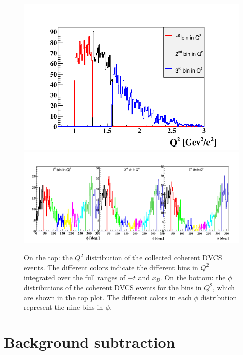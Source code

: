 \begin{figure}[h!]
\centering
\includegraphics[scale=0.36]{fig_results/Q2_Coh_bins.png}
\includegraphics[scale=0.45]{fig_results/bins_Coh_Q2_Phi.png}
\caption{On the top: the $Q^2$ distribution of the collected coherent DVCS events. The different colors indicate the different bins in $Q^2$ integrated over the full ranges of $-t$ and $x_B$. On the bottom: the $\phi$ distributions of the coherent DVCS events for the bins in $Q^2$, which are shown in the top plot. The different colors in each $\phi$ distribution represent the nine bins in $\phi$.} 
\label{fig:coh_Q2_bins}
\end{figure}


\section{Background subtraction}
\label{Background_subtraction}

